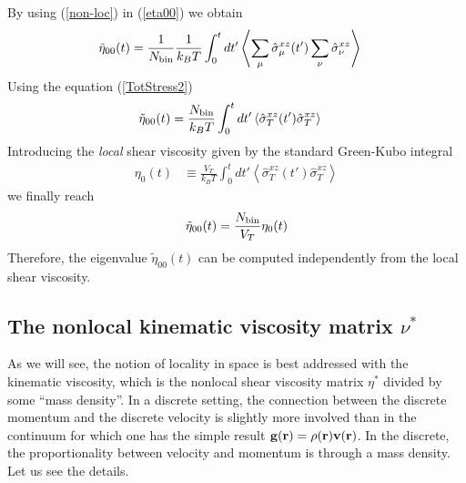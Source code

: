 \documentclass[b5paper,openright,10pt]{book}
\newcommand{\llangle}{\left\langle}
\newcommand{\rrangle}{\right\rangle}
\begin{document}
By using (\ref{non-loc}) in (\ref{eta00}) we obtain
\begin{align}
    \tilde{\eta}_{00}(t)&=\frac{1}{N_{\rm bin}}\frac{1}{k_BT}\int_0^tdt'\llangle \sum_{\mu}\hat{\sigma}^{xz}_{\mu}(t')\sum_{\nu}\hat{\sigma}^{xz}_{\nu}\rrangle
\end{align}
Using the equation (\ref{TotStress2})
\begin{align}
    \tilde{\eta}_{00}(t)&=\frac{N_{\rm bin}}{k_BT}\int_0^tdt'\llangle \hat{\sigma}^{xz}_T(t')\hat{\sigma}^{xz}_T\rrangle
\end{align}
Introducing the \textit{local}  shear viscosity given by the standard Green-Kubo
integral
\begin{align}
  \eta_0(t) &\equiv \frac{V_T}{k_BT}\int_0^t dt'\llangle \hat{\sigma}_T^{xz}(t')\hat{\sigma}_T^{xz}
\rrangle
\label{etat}
\end{align}
we finally reach 
\begin{align}
    \tilde{\eta}_{00}(t)=\frac{N_{\rm bin}}{V_T}\eta_0(t)
\end{align}
Therefore, the eigenvalue $\tilde{\eta}_{00}(t)$ can be computed independently from
the local shear viscosity.

\subsection{The nonlocal kinematic viscosity matrix $\nu^*$}
As we will see, the notion of locality in space
is best addressed with the kinematic  viscosity, which is the nonlocal shear viscosity matrix $\eta^*$ divided by some ``mass density''. In  a discrete setting, the connection between
the  discrete momentum  and  the discrete  velocity  is slightly  more
involved than  in the continuum  for which  one has the  simple result
${\bf g}({\bf  r})=\rho({\bf r}){\bf  v}({\bf r})$.  In  the discrete,
the proportionality  between velocity and  momentum is through  a mass
density.  Let us see the details.
\end{document}
